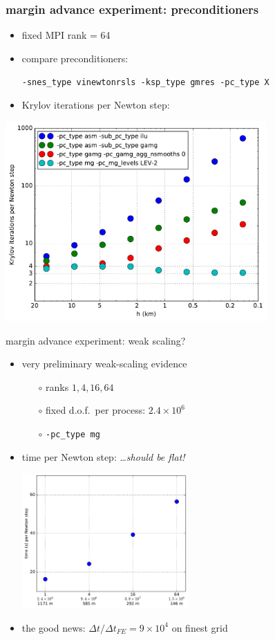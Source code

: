 \documentclass[hide notes,intlimits,usenames,dvipsnames]{beamer}
\begin{document}
\begin{frame}[fragile]
\frametitle{margin advance experiment: preconditioners}
\begin{itemize}
\item fixed MPI rank = 64
\item compare preconditioners:

\small
\centerline{\texttt{-snes\_type vinewtonrsls -ksp\_type gmres -pc\_type X}}
\normalsize
\item Krylov iterations per Newton step:
\end{itemize}

\begin{center}
\includegraphics[width=0.75\textwidth]{pcksppernewton.pdf}
\end{center}
\end{frame}


\begin{frame}{margin advance experiment:  weak scaling?}
\begin{itemize}
\item very preliminary weak-scaling evidence
    \begin{itemize}
    \item[$\circ$] ranks $1,4,16,64$
    \item[$\circ$] fixed d.o.f.~per process: $2.4 \times 10^6$
    \item[$\circ$] \texttt{-pc\_type mg}
    \end{itemize}
\item time per Newton step: \hfill \dots \emph{should be flat!}

\begin{center}
\includegraphics[width=0.5\textwidth]{timepernewtonweak.pdf}
\end{center}

\item<2> the good news: $\Delta t/\Delta t_{FE} = 9 \times 10^4$ on finest grid
\end{itemize}
\end{frame}
\end{document}
